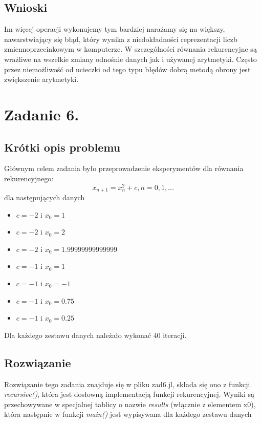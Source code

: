 \documentclass[a4paper,14pt]{report}
\begin{document}
  \section{Wnioski}
    Im więcej operacji wykonujemy tym bardziej narażamy się na większy, nawarstwiający się błąd, który wynika z niedokładności reprezentacji liczb zmiennoprzecinkowym w komputerze. W szczególności równania rekurencyjne są wrażliwe na wszelkie zmiany odnośnie danych jak i używanej arytmetyki. Często przez niemożliwość od ucieczki od tego typu błędów dobrą metodą obrony jest zwiększenie arytmetyki.
\chapter{Zadanie 6.}
  \section{Krótki opis problemu}
    Głównym celem zadania było przeprowadzenie eksperymentów dla równania rekurencyjnego:
    \begin{equation}
      x_{n+1} = x_{n}^{2}+c,n=0,1,...
    \end{equation}
    dla następujących danych
    \begin{itemize}
      \item $c=-2$ i $x_{0}=1$
      \item $c=-2$ i $x_{0}=2$
      \item $c=-2$ i $x_{0}=1.99999999999999$
      \item $c=-1$ i $x_{0}=1$
      \item $c=-1$ i $x_{0}=-1$
      \item $c=-1$ i $x_{0}=0.75$
      \item $c=-1$ i $x_{0}=0.25$
    \end{itemize}
    Dla każdego zestawu danych należało wykonać 40 iteracji.
  \section{Rozwiązanie}
    Rozwiązanie tego zadania znajduje się w pliku zad6.jl, składa się ono z funkcji \textit{recursive()}, która jest dosłowną implementacją funkcji rekurencyjnej. Wyniki są przechowywane w specjalnej tablicy o nazwie \textit{results} (włącznie z elementem x0), która następnie w funkcji \textit{main()} jest wypisywana dla każdego zestawu danych
\end{document}
